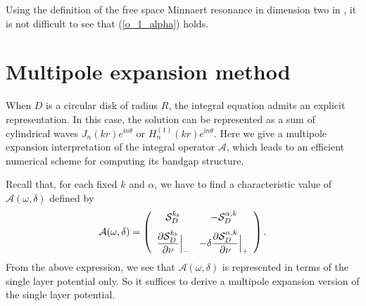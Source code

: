 \documentclass[11pt]{article}
\numberwithin{equation}{section}
\newcommand{\ds}{\displaystyle}
\def\nm{\noalign{\medskip}}
\def\ri{{\mathrm{i}}}
\newcommand\1{{\ensuremath {\mathds 1} }}
\begin{document}
{{Using the definition of the free space Minnaert resonance in dimension two in \cite[Theorem B1]{H3a}, it is not difficult to see that  (\ref{o_1_alpha}) holds.


\section{Multipole expansion method}\label{sec:appendix_multipole}


When $D$ is a circular disk of radius $R$, the integral equation admits an explicit representation. In this case, the solution can be represented as a sum of cylindrical waves $J_n(k r)e^{\ri n\theta}$ or $H_n^{(1)}(k r)e^{\ri n\theta}$. Here we give a multipole expansion interpretation of the integral operator $\mathcal{A}$, which leads to an efficient numerical scheme for computing its bandgap structure. 


Recall that, for each fixed $k$ and $\alpha$, we have to find a characteristic value of $\mathcal{A}(\omega, \delta)$ defined by
 \begin{equation} \label{aalpha2}
 \mathcal{A}(\omega, \delta)  = \left(\begin{array}{cc}
 \mathcal{S}^{k_b}_D  & - \mathcal{S}^{\alpha,
k}_D  \\ \nm \ds \frac{\p \mathcal{S}_D^{{k}_b}}{\p\nu}\Big|_- &
 \ds -\delta\frac{\p \mathcal{S}_D^{\alpha,k}}{\p\nu}\Big|_+ \end{array} \right).
 \end{equation}
From the above expression, we see that $\mathcal{A}(\omega, \delta)$ is represented in terms of the single layer potential only.
So it suffices to derive a multipole expansion version of the single layer potential.


}}
\end{document}

